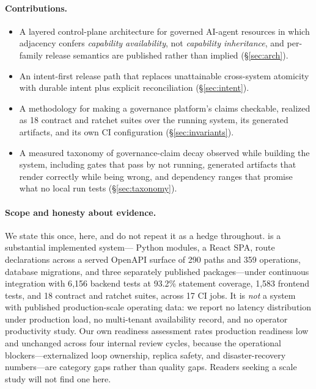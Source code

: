 \documentclass{article}
\begin{document}
\paragraph{Contributions.}
\begin{itemize}[leftmargin=1.1em]
\item A layered control-plane architecture for governed AI-agent resources in which
adjacency confers \emph{capability availability}, not \emph{capability
inheritance}, and per-family release semantics are published rather than implied
(\S\ref{sec:arch}).
\item An intent-first release path that replaces unattainable cross-system
atomicity with durable intent plus explicit reconciliation (\S\ref{sec:intent}).
\item A methodology for making a governance platform's claims checkable, realized
as 18 contract and ratchet suites over the running system, its generated artifacts,
and its own CI configuration (\S\ref{sec:invariants}).
\item A measured taxonomy of governance-claim decay observed while building the
system, including gates that pass by not running, generated artifacts that render
correctly while being wrong, and dependency ranges that promise what no local run
tests (\S\ref{sec:taxonomy}).
\end{itemize}

\paragraph{Scope and honesty about evidence.}
We state this once, here, and do not repeat it as a hedge throughout. \sys is a
substantial implemented system---\statPyFiles{} Python modules, a React SPA,
\statRouteDecls{} route declarations across a served OpenAPI surface of 290 paths
and 359 operations, \statMigrations{} database migrations, and three separately
published packages---under continuous integration with 6{,}156 backend tests at
93.2\% statement coverage, 1{,}583 frontend tests, and 18 contract and ratchet
suites, across 17 CI jobs. It is \emph{not} a system with published
production-scale operating data: we report no latency distribution under production
load, no multi-tenant availability record, and no operator productivity study. Our
own readiness assessment rates production readiness low and unchanged across four
internal review cycles, because the operational blockers---externalized loop
ownership, replica safety, and disaster-recovery numbers---are category gaps rather
than quality gaps. Readers seeking a scale study will not find one here.
\end{document}
